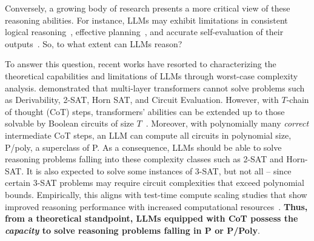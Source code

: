 \documentclass{article} %
\begin{document}
Conversely, a growing body of research presents a more critical view of these reasoning abilities. For instance, LLMs may exhibit limitations in consistent logical reasoning~\citep{gpt4_cant_reason,llms_are_greedy_reasoners}, effective planning~\citep{llms_cant_plan}, and accurate self-evaluation of their outputs~\citep{gpt_graph_coloring}. So, to what extent can LLMs reason?

To answer this question, recent works have resorted to characterizing the theoretical capabilities and limitations of LLMs through worst-case complexity analysis. 
\citet{limits_of_transformer_architectures} demonstrated that multi-layer transformers cannot solve problems such as Derivability, 2-SAT, Horn SAT, and Circuit Evaluation. However, with $T$-chain of thought (CoT) steps, transformers' abilities can be extended up to those solvable by Boolean circuits of size $T$~\citep{cot_complexity}. Moreover, with polynomially many \emph{correct} intermediate CoT steps, an LLM can compute all circuits in polynomial size, P/poly, a superclass of P. As a consequence, LLMs should be able to solve reasoning problems falling into these complexity classes such as 2-SAT and Horn-SAT. It is also expected to solve some instances of 3-SAT, but not all -- since certain 3-SAT problems may require circuit complexities that exceed polynomial bounds. Empirically, this aligns with test-time compute scaling studies that show improved reasoning performance with increased computational resources~\citep{verify_step_by_step,test_time_compute_scaling}. \textbf{Thus, from a theoretical standpoint, LLMs equipped with CoT possess the \emph{capacity} to solve reasoning problems falling in P or P/Poly}.

\end{document}

